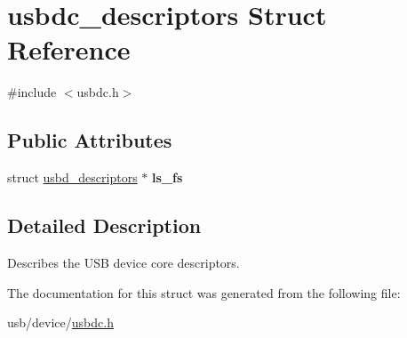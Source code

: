 \hypertarget{structusbdc__descriptors}{}\section{usbdc\+\_\+descriptors Struct Reference}
\label{structusbdc__descriptors}


{\ttfamily \#include $<$usbdc.\+h$>$}

\subsection*{Public Attributes}
\begin{DoxyCompactItemize}
\item 
\mbox{\label{structusbdc__descriptors_aaf8bbb58ea3edb6d04d6f416d8cde81b}} 
struct \hyperlink{structusbd__descriptors}{usbd\+\_\+descriptors} $\ast$ {\bfseries ls\+\_\+fs}
\end{DoxyCompactItemize}


\subsection{Detailed Description}
Describes the U\+SB device core descriptors. 

The documentation for this struct was generated from the following file\+:\begin{DoxyCompactItemize}
\item 
usb/device/\hyperlink{usbdc_8h}{usbdc.\+h}\end{DoxyCompactItemize}
